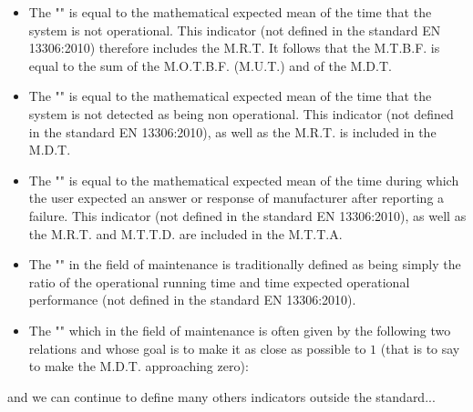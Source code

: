\begin{itemize}
		\item The "" is equal to the mathematical expected mean of the time that the system is not operational. This indicator (not defined in the standard EN 13306:2010) therefore includes the M.R.T. It follows that the M.T.B.F. is equal to the sum of the M.O.T.B.F. (M.U.T.) and of the M.D.T.
		
		\item The "" is equal to the mathematical expected mean of the time that the system is not detected as being non operational. This indicator (not defined in the standard EN 13306:2010), as well as the M.R.T. is included in the M.D.T.
		
		\item The "" is equal to the mathematical expected mean of the time during which the user expected an answer or response of manufacturer after reporting a failure. This indicator (not defined in the standard EN 13306:2010), as well as the M.R.T. and M.T.T.D. are included in the M.T.T.A.
		
		\item The "" in the field of maintenance is traditionally defined as being simply the ratio of the operational running time and time expected operational performance (not defined in the standard EN 13306:2010).
		
		\item The "" which in the field of maintenance is often given by the following two relations and whose goal is to make it as close as possible to $1$ (that is to say to make the M.D.T. approaching zero):
		
	\end{itemize}
	and we can continue to define many others indicators outside the standard...
	
